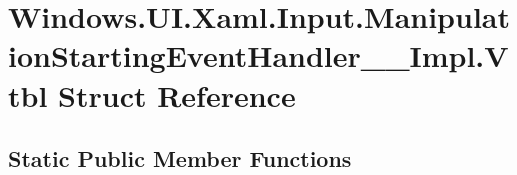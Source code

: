 \hypertarget{struct_windows_1_1_u_i_1_1_xaml_1_1_input_1_1_manipulation_starting_event_handler_____impl_1_1_vtbl}{}\section{Windows.\+U\+I.\+Xaml.\+Input.\+Manipulation\+Starting\+Event\+Handler\+\_\+\+\_\+\+Impl.\+Vtbl Struct Reference}
\label{struct_windows_1_1_u_i_1_1_xaml_1_1_input_1_1_manipulation_starting_event_handler_____impl_1_1_vtbl}
\subsection*{Static Public Member Functions}
